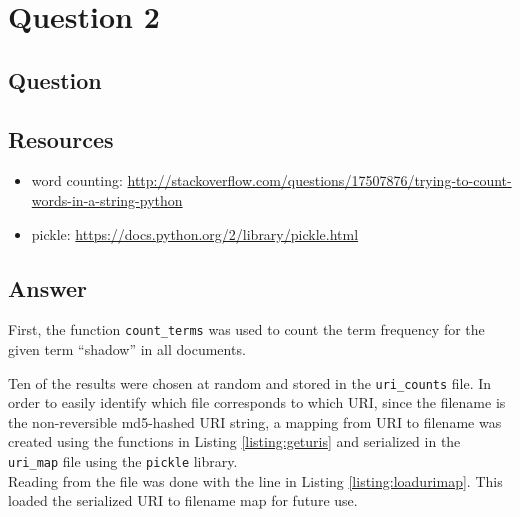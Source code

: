 \section{Question 2}

\subsection{Question}


\subsection{Resources}
\begin{itemize}
\item word counting: \url{http://stackoverflow.com/questions/17507876/trying-to-count-words-in-a-string-python}
\item pickle: \url{https://docs.python.org/2/library/pickle.html}
\end{itemize}

\subsection{Answer}
First, the function {\tt count\_terms} was used to count the term frequency for the given term ``shadow'' in all documents.

\newpage


Ten of the results were chosen at random and stored in the {\tt uri\_counts} file. In order to easily identify which file corresponds to which URI, since the filename is the non-reversible md5-hashed URI string, a mapping from URI to filename was created using the functions in Listing \ref{listing:geturis} and serialized in the {\tt uri\_map} file using the {\tt pickle} library.\\



Reading from the file was done with the line in Listing \ref{listing:loadurimap}. This loaded the serialized URI to filename map for future use.\\



